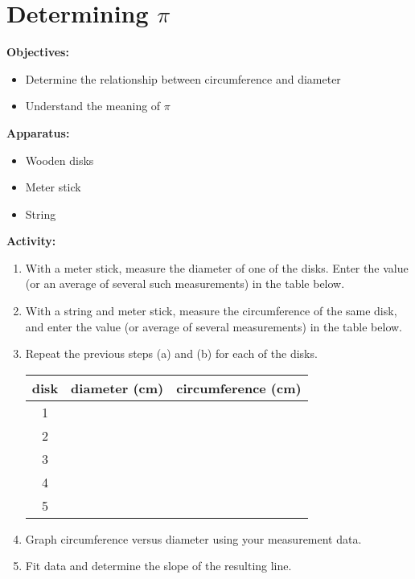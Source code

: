 
\section{Determining $\pi$}

\makelabheader %

\textbf{Objectives:}

\begin{itemize}[nosep]
\item Determine the relationship between circumference and diameter 
\item Understand the meaning of $\pi$
\end{itemize}

\textbf{Apparatus:}

\begin{itemize}[nosep]
\item Wooden disks
\item Meter stick
\item String
\end{itemize}
\textbf{Activity:}

\begin{enumerate}[labparts]

\item With a meter stick, measure the diameter of one of the disks. Enter the value (or an average of several such measurements) in the table below.

\item With a string and meter stick, measure the circumference of the same disk, and enter the value (or average of several measurements) in the table below.

\item Repeat the previous steps (a) and (b) for each of the disks.

\begin{center} \begin{tabular}{|c|c|c|} \hline disk & diameter (cm) & circumference (cm) \\ \hline\hline 1 & & \\ \hline 2 & & \\ \hline 3 & & \\ \hline 4 & & \\ \hline 5 & & \\ \hline \end{tabular} \end{center}

\item Graph circumference versus diameter using your measurement data.

\item Fit data and determine the slope of the resulting line. \end{enumerate}

